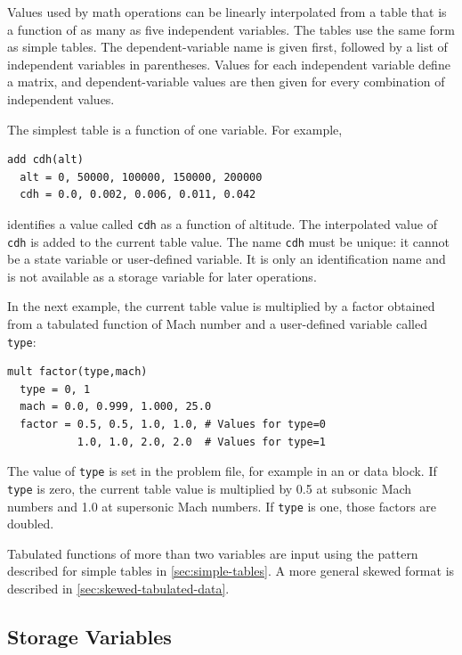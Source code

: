 Values used by math operations can be linearly interpolated from a table that is a
function of as many as five independent variables. The tables use the same form as
simple tables. The dependent-variable name is given first, followed by a list of
independent variables in parentheses. Values for each independent variable define a
matrix, and dependent-variable values are then given for every combination of
independent values.

The simplest table is a function of one variable. For example,

\begin{lstlisting}[style=taosmanual]
add cdh(alt)
  alt = 0, 50000, 100000, 150000, 200000
  cdh = 0.0, 0.002, 0.006, 0.011, 0.042
\end{lstlisting}

identifies a value called \texttt{cdh} as a function of altitude. The interpolated value
of \texttt{cdh} is added to the current table value. The name \texttt{cdh} must be
unique: it cannot be a state variable or user-defined variable. It is only an
identification name and is not available as a storage variable for later operations.

In the next example, the current table value is multiplied by a factor obtained from
a tabulated function of Mach number and a user-defined variable called
\texttt{type}:

\begin{lstlisting}[style=taosmanual]
mult factor(type,mach)
  type = 0, 1
  mach = 0.0, 0.999, 1.000, 25.0
  factor = 0.5, 0.5, 1.0, 1.0, # Values for type=0
           1.0, 1.0, 2.0, 2.0  # Values for type=1
\end{lstlisting}

The value of \texttt{type} is set in the problem file, for example in an
 or  data block. If \texttt{type} is zero,
the current table value is multiplied by 0.5 at subsonic Mach numbers and 1.0 at
supersonic Mach numbers. If \texttt{type} is one, those factors are doubled.

Tabulated functions of more than two variables are input using the pattern described
for simple tables in \cref{sec:simple-tables}. A more general skewed format is
described in \cref{sec:skewed-tabulated-data}.

\subsection{Storage Variables}\label{sec:storage-variables}

